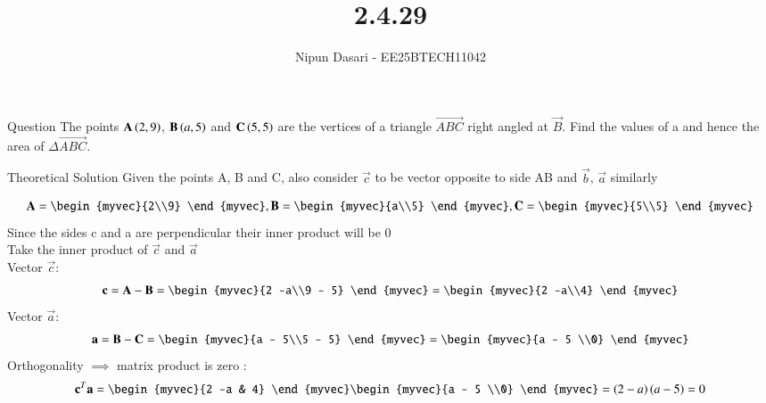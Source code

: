 \documentclass{beamer}
\title %
{2.4.29}
\author %
{Nipun Dasari - EE25BTECH11042}
\begin{document}
	
		\frame{\titlepage}
	\begin{frame}{Question}
	The points $\mathbf{A}\left(2, 9\right)$, $\mathbf{B}\left(a, 5\right)$ and $\mathbf{C}\left(5, 5\right)$ are the vertices of a triangle $\vec{ABC}$ right angled
	at $\vec{B}$. Find the values of a and hence the area of $\Delta\vec{ABC}$. \\
	\end{frame}

	
\begin{frame}{Theoretical Solution}
	Given the points A, B and C, also consider $\vec{c}$ to be vector opposite to side AB and $\vec{b}$, $\vec{a}$ similarly

\begin{align}
	\vec{A} = \begin{myvec}{2\\9} \end{myvec} , \vec{B} = \begin{myvec}{a\\5} \end{myvec}, \vec{C} = \begin{myvec}{5\\5} \end{myvec}
\end{align}
Since the sides c and a are perpendicular their inner product will be 0\\
Take the inner product of $\vec{c}$ and $\vec{a}$\\
Vector $\vec{c}$:
\begin{align}
	\vec{c} = \vec{A}-\vec{B} = \begin{myvec}{2 -a\\9 - 5} \end{myvec} = \begin{myvec}{2 -a\\4} \end{myvec}
\end{align}
Vector $\vec{a}$:
\begin{align}
	\vec{a} = \vec{B}-\vec{C} = \begin{myvec}{a - 5\\5 - 5} \end{myvec} = \begin{myvec}{a - 5 \\0} \end{myvec}
\end{align}
Orthogonality $\implies$ matrix product is zero :
\begin{align}
	\vec{c}^T\vec{a} = \begin{myvec}{2 -a & 4} \end{myvec}\begin{myvec}{a - 5 \\0} \end{myvec} = \brak{2-a}\brak{a-5} = 0
\end{align}
\end{frame}
\end{document}
